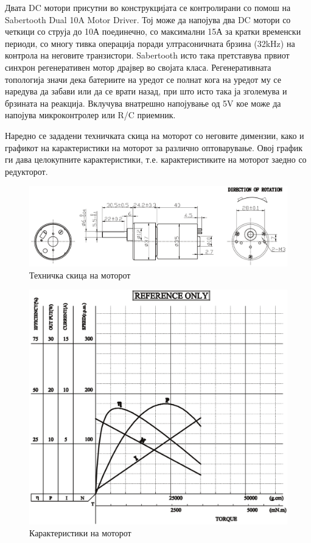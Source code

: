 \documentclass{article}
\begin{document}
Двата DC мотори присутни во конструкцијата се контролирани со помош на Sabertooth Dual 10A Motor Driver. Тој може да напојува два DC мотори со четкици со струја до 10А поединечно, со максимални 15А за кратки временски периоди, со многу тивка операција поради ултрасоничната брзина (32kHz) на контрола на неговите транзистори. Sabertooth исто така претставува првиот синхрон регенеративен мотор драјвер во својата класа. Регенеративната топологија значи дека батериите на уредот се полнат кога на уредот му се наредува да забави или да се врати назад, при што исто така ја зголемува и брзината на реакција. Вклучува внатрешно напојување од 5V кое може да напојува микроконтролер или R/C приемник. 

Наредно се зададени техничката скица на моторот со неговите димензии, како и графикот на карактеристики на моторот за различно оптоварување. Овој график ги дава целокупните карактеристики, т.е. карактеристиките на моторот заедно со редукторот.

\begin{figure}[H]
\includegraphics[width=0.75\linewidth]{motor_schematic.png}
\centering
\caption{Техничка скица на моторот}
\label{fig:motor_schematic.png}
\end{figure}

\begin{figure}[H]
\includegraphics[width=0.75\linewidth]{motor_graph.png}
\centering
\caption{Карактеристики на моторот}
\label{fig:motor_graph.png}
\end{figure}
\end{document}
